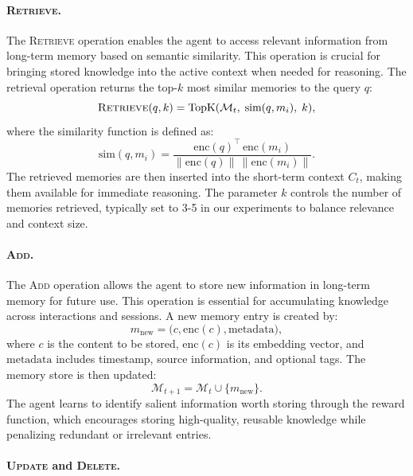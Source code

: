 \paragraph{\textsc{Retrieve}.}
The \textsc{Retrieve} operation enables the agent to access relevant information from long-term memory based on semantic similarity. This operation is crucial for bringing stored knowledge into the active context when needed for reasoning. The retrieval operation returns the top-$k$ most similar memories to the query $q$:
\begin{equation}
\textsc{Retrieve}(q, k) = \text{TopK}(\mathcal{M}_t, \; \text{sim}(q, m_i), \; k),
\end{equation}
where the similarity function is defined as:
\begin{equation}
\text{sim}(q, m_i) =
\frac{\text{enc}(q)^\top \, \text{enc}(m_i)}
{\|\text{enc}(q)\| \, \|\text{enc}(m_i)\|}.
\end{equation}
The retrieved memories are then inserted into the short-term context $C_t$, making them available for immediate reasoning. The parameter $k$ controls the number of memories retrieved, typically set to 3-5 in our experiments to balance relevance and context size.

\paragraph{\textsc{Add}.}
The \textsc{Add} operation allows the agent to store new information in long-term memory for future use. This operation is essential for accumulating knowledge across interactions and sessions. A new memory entry is created by:
\begin{equation}
m_{\text{new}} = \big(c, \text{enc}(c), \text{metadata}\big),
\end{equation}
where $c$ is the content to be stored, $\text{enc}(c)$ is its embedding vector, and $\text{metadata}$ includes timestamp, source information, and optional tags. The memory store is then updated:
\begin{equation}
\mathcal{M}_{t+1} = \mathcal{M}_t \cup \{m_{\text{new}}\}.
\end{equation}
The agent learns to identify salient information worth storing through the reward function, which encourages storing high-quality, reusable knowledge while penalizing redundant or irrelevant entries.

\paragraph{\textsc{Update} and \textsc{Delete}.}

